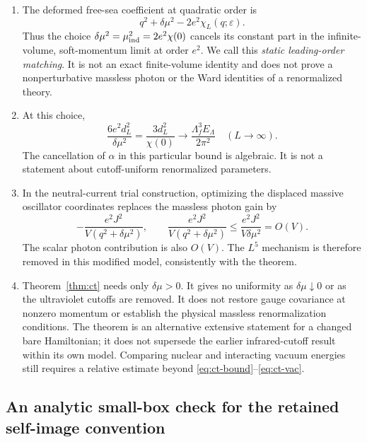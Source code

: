 \begin{remark}
\label{rem:ct-choice}
\begin{enumerate}[label=(\alph*)]
\item The deformed free-sea coefficient at quadratic order is
\[
q^2+\delta\mu^2-2e^2\chi_L(q;\varepsilon).
\]
Thus the choice
\(\delta\mu^2=\mu_{\rm ind}^2=2e^2\chi(0)\) cancels its constant part
in the infinite-volume, soft-momentum limit at order \(e^2\).
We call this \emph{static leading-order matching}. It is not an exact
finite-volume identity and does not prove a nonperturbative massless photon
or the Ward identities of a renormalized theory.
\item At this choice,
\[
 \frac{6e^2d_L^2}{\delta\mu^2}
 =\frac{3d_L^2}{\chi(0)}
 \longrightarrow\frac{\Lambda_f^3E_\Lambda}{2\pi^2}
 \quad(L\to\infty).
\]
The cancellation of \(\alpha\) in this particular bound is algebraic.
It is not a statement about cutoff-uniform renormalized parameters.
\item In the neutral-current trial construction, optimizing the displaced
massive oscillator coordinates replaces the massless photon gain by
\[
 -\frac{e^2J^2}{V(q^2+\delta\mu^2)},
 \qquad
 \frac{e^2J^2}{V(q^2+\delta\mu^2)}
 \leq\frac{e^2J^2}{V\delta\mu^2}=O(V).
\]
The scalar photon contribution is also \(O(V)\). The \(L^5\) mechanism
is therefore removed in this modified model, consistently with the theorem.
\item Theorem~\ref{thm:ct} needs only \(\delta\mu>0\). It gives no
uniformity as \(\delta\mu\downarrow0\) or as the ultraviolet cutoffs are
removed. It does not restore gauge covariance at nonzero momentum or
establish the physical massless renormalization conditions. The theorem
is an alternative extensive statement for a changed bare Hamiltonian;
it does not supersede the earlier infrared-cutoff result within its own
model. Comparing nuclear and interacting vacuum energies still requires
a relative estimate beyond \eqref{eq:ct-bound}--\eqref{eq:ct-vac}.
\end{enumerate}
\end{remark}

\subsection{An analytic small-box check for the retained self-image convention}

